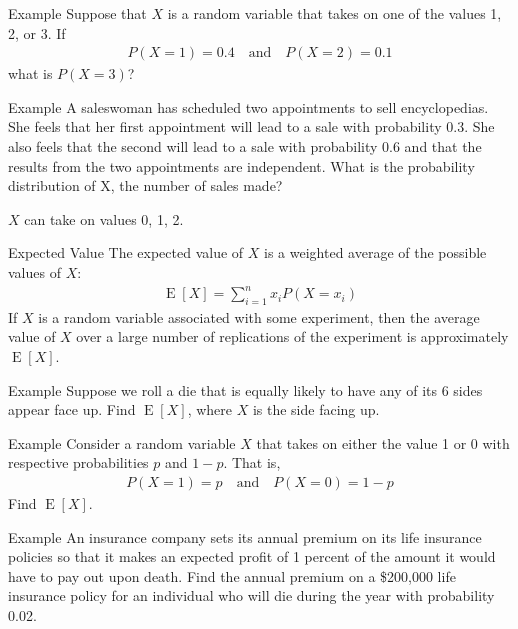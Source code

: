 \documentclass{beamer}
\newcommand{\E}{\operatorname{E}}
\begin{document}
\begin{frame}[t]{Example}
  Suppose that $X$ is a random variable that takes on one of the values 1, 2, or
  3. If
  \begin{align*}
    P(X=1) = 0.4\quad\text{and}\quad P(X=2) = 0.1
  \end{align*}
  what is $P(X=3)$?
\end{frame}

\begin{frame}[t]{Example}
  A saleswoman has scheduled two appointments to sell encyclopedias. She feels
  that her first appointment will lead to a sale with probability 0.3. She also
  feels that the second will lead to a sale with probability 0.6 and that the
  results from the two appointments are independent. What is the probability
  distribution of X, the number of sales made?

  $X$ can take on values 0, 1, 2.
\end{frame}

\begin{frame}{Expected Value}
  The \alert{expected value} of $X$ is a \alert{weighted average} of the
  possible values of $X$:
  \begin{align*}
    \E[X] = \sum_{i=1}^n x_i P(X = x_i)
  \end{align*}
  If $X$ is a random variable associated with some experiment, then the average
  value of $X$ over a large number of replications of the experiment is
  approximately $\E[X]$.
\end{frame}

\begin{frame}[t]{Example}
  Suppose we roll a die that is equally likely to have any of its 6 sides appear
  face up. Find $\E[X]$, where $X$ is the side facing up.
\end{frame}

\begin{frame}[t]{Example}
  Consider a random variable $X$ that takes on either the value 1 or 0 with
  respective probabilities $p$ and $1-p$. That is,
  \begin{align*}
    P(X = 1) = p\quad\text{and}\quad P(X = 0) = 1 - p
  \end{align*}
  Find $\E[X]$.
\end{frame}

\begin{frame}[t]{Example}
  An insurance company sets its annual premium on its life insurance policies
  so that it makes an expected profit of 1 percent of the amount it would have
  to pay out upon death. Find the annual premium on a \$200,000 life insurance
  policy for an individual who will die during the year with probability 0.02.
\end{frame}
\end{document}
